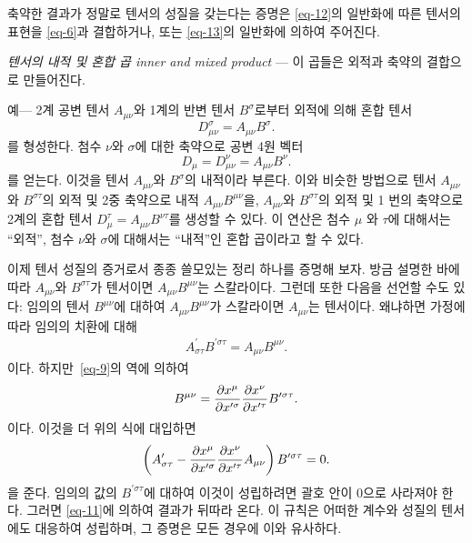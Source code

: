 \documentclass[b5paper]{article}
\begin{document}
축약한 결과가 정말로 텐서의 성질을 갖는다는 증명은 \eqref{eq-12}의 일반화에 따른 텐서의 표현을 \eqref{eq-6}과 결합하거나, 또는 \eqref{eq-13}의 일반화에 의하여 주어진다.
  
\emph{텐서의 내적 및 혼합 곱 inner and mixed product} ---
이 곱들은 외적과 축약의 결합으로 만들어진다.

예--- 2계 공변 텐서 $A_{\mu\nu}$와 1계의 반변 텐서 $B^{\sigma}$로부터 외적에 의해 혼합 텐서 
\begin{equation*}
D_{\mu\nu}^{\sigma}=A_{\mu\nu} B^{\sigma}.
\end{equation*}
를 형성한다. 첨수 $\nu$와 $\sigma$에 대한 축약으로 공변 4원 벡터
\begin{equation*}
	D_\mu = D_{\mu\nu}^{\nu}=A_{\mu\nu} B^{\nu}.
\end{equation*}
를 얻는다. 이것을 텐서 $A_{\mu\nu}$와  $B^{\sigma}$의 내적이라 부른다. 이와 비슷한 방법으로 
텐서 $A_{\mu\nu}$와 $B^{\sigma\tau}$의 외적 및 2중 축약으로 내적 $A_{\mu\nu} B^{\mu\nu}$을, $A_{\mu\nu}$와 $B^{\sigma\tau}$의 외적 및 1 번의 축약으로 2계의 혼합 텐서 $D_\mu^\tau=A_{\mu\nu} B^{\nu\tau}$를 생성할 수 있다. 이 연산은 첨수 $\mu$ 와 $\tau$에 대해서는 ``외적'', 첨수 $\nu$와 $\sigma$에 대해서는 ``내적''인 혼합 곱이라고 할 수 있다.

이제 텐서 성질의 증거로서 종종 쓸모있는 정리 하나를 증명해 보자. 방금 설명한 바에 따라 
$A_{\mu\nu}$와 $B^{\sigma\tau}$가 텐서이면 $A_{\mu\nu}B^{\mu\nu}$는 스칼라이다. 그런데 또한 다음을 선언할 수도 있다: 임의의 텐서 $B^{\mu\nu}$에 대하여  $A_{\mu\nu}B^{\mu\nu}$가 스칼라이면 $A_{\mu\nu}$는 텐서이다. 왜냐하면 가정에 따라 임의의 치환에 대해
\begin{align*}
	A_{\sigma\tau}^\prime B^{\prime\sigma\tau}=A_{\mu\nu}B^{\mu\nu}.
\end{align*}이다.
하지만~\eqref{eq-9}의 역에 의하여
\begin{equation*}
	B^{\mu\nu}={\frac{{\partial}{x^\mu}}{{\partial}{x^{\prime\sigma}}}}{\frac{{\partial}{x^\nu}}{{\partial}{x^{\prime\tau}}}} B^{\prime\sigma\tau}.
\end{equation*}이다. 이것을 더 위의 식에 대입하면
\begin{equation*}
\left(A_{\sigma\tau}^\prime - {\frac{{\partial}{x^\mu}}{{\partial}{x^{\prime\sigma}}}}{\frac{{\partial}{x^\nu}}{{\partial}{x^{\prime\tau}}}} A_{\mu\nu} \right) B^{\prime\sigma\tau}=0.
\end{equation*}을 준다. 임의의 값의 $B^{\prime\sigma\tau}$에 대하여 이것이 성립하려면 괄호 안이 0으로 사라져야 한다.
그러면 \eqref{eq-11}에 의하여 결과가 뒤따라 온다. 이 규칙은 어떠한 계수와 성질의 텐서에도 대응하여 성립하며, 그 증명은 모든 경우에 이와 유사하다.
\end{document}
